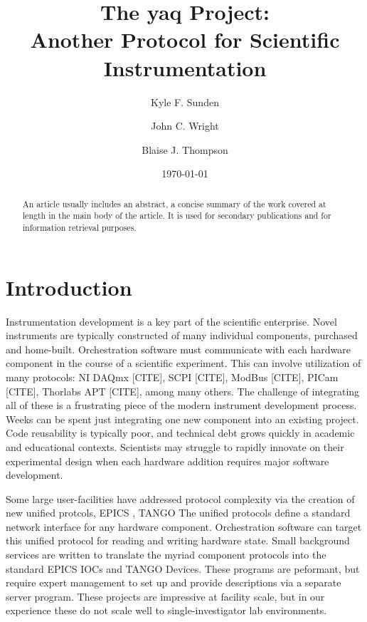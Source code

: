 \documentclass[aip, amsmath, amssymb, reprint,]{revtex4-1}
\begin{document}

\title{The yaq Project: \\ Another Protocol for Scientific Instrumentation}
\author{Kyle F. Sunden}
\author{John C. Wright}
\author{Blaise J. Thompson}

\date{\today}

\begin{abstract}
An article usually includes an abstract, a concise summary of the work
covered at length in the main body of the article. It is used for
secondary publications and for information retrieval purposes.
\end{abstract}

\maketitle

\section{Introduction}

Instrumentation development is a key part of the scientific enterprise.
Novel instruments are typically constructed of many individual components, purchased and home-built.
Orchestration software must communicate with each hardware component in the course of a scientific experiment.
This can involve utilization of many protocols: NI DAQmx [CITE], SCPI [CITE], ModBus [CITE], PICam [CITE], Thorlabs APT [CITE], among many others.
The challenge of integrating all of these is a frustrating piece of the modern instrument development process.
Weeks can be spent just integrating one new component into an existing project.
Code reusability is typically poor, and technical debt grows quickly in academic and educational contexts.
Scientists may struggle to rapidly innovate on their experimental design when each hardware addition requires major software development.

Some large user-facilities have addressed protocol complexity via the creation of new unified protcols, EPICS \cite{DalesioLR1991a}, TANGO \cite{tango-controls.org}
The unified protocols define a standard network interface for any hardware component.
Orchestration software can target this unified protocol for reading and writing hardware state.
Small background services are written to translate the myriad component protocols into the standard EPICS IOCs and TANGO Devices.
These programs are peformant, but require expert management to set up and provide descriptions via a separate server program.
These projects are impressive at facility scale, but in our experience these do not scale well to single-investigator lab environments.
\end{document}
